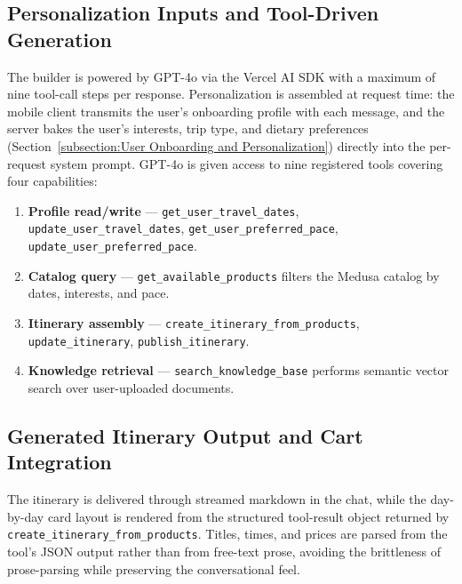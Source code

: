 \subsection{Personalization Inputs and Tool-Driven Generation}
The builder is powered by GPT-4o via the Vercel AI SDK with a maximum of nine tool-call steps per response. Personalization is assembled at request time: the mobile client transmits the user's onboarding profile with each message, and the server bakes the user's interests, trip type, and dietary preferences (Section~\ref{subsection:User Onboarding and Personalization}) directly into the per-request system prompt.
GPT-4o is given access to nine registered tools covering four capabilities:

{\sloppy
\begin{enumerate}
  \item \textbf{Profile read/write} --- \texttt{get\_\allowbreak user\_\allowbreak travel\_\allowbreak dates}, \texttt{update\_\allowbreak user\_\allowbreak travel\_\allowbreak dates}, \texttt{get\_\allowbreak user\_\allowbreak preferred\_\allowbreak pace}, \texttt{update\_\allowbreak user\_\allowbreak preferred\_\allowbreak pace}.
  \item \textbf{Catalog query} --- \texttt{get\_\allowbreak available\_\allowbreak products} filters the Medusa catalog by dates, interests, and pace.
  \item \textbf{Itinerary assembly} --- \texttt{create\_\allowbreak itinerary\_\allowbreak from\_\allowbreak products}, \texttt{update\_\allowbreak itinerary}, \texttt{publish\_\allowbreak itinerary}.
  \item \textbf{Knowledge retrieval} --- \texttt{search\_\allowbreak knowledge\_\allowbreak base} performs semantic vector search over user-uploaded documents.
\end{enumerate}
\par}

\subsection{Generated Itinerary Output and Cart Integration}
The itinerary is delivered through streamed markdown in the chat, while the day-by-day card layout is rendered from the structured tool-result object returned by \texttt{create\_itinerary\_from\_products}. Titles, times, and prices are parsed from the tool's JSON output rather than from free-text prose, avoiding the brittleness of prose-parsing while preserving the conversational feel.

